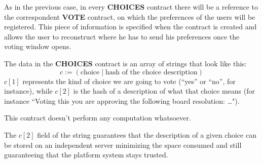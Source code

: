 \documentclass[submission, copyright,creativecommons,sharealike,noncommercial]{eptcs}
\newcommand{\Choices}{\textbf{CHOICES}\xspace}
\newcommand{\Vote}{\textbf{VOTE}\xspace}
\begin{document}
	As in the previous case, in every \Choices contract there will be a reference to the correspondent \Vote contract, on which the preferences of the users will be registered. This piece of information is specified when the contract is created and allows the user to reconstruct where he has to send his preferences once the voting window opens.
	
	The data in the \Choices contract is an array of strings that look like this: 
	\[
	c := (\text{choice} \mid \text{hash of the choice description})
	\]
	$c[1]$ represents the kind of choice we are going to vote (``yes'' or ``no'', for instance), while $c[2]$ is the hash of a description of what that choice means (for instance ``Voting this you are approving the following board resolution: \dots"). 

	This contract doesn't perform any computation whatsoever.
	
	The $c[2]$ field of the string guarantees that the description of a given choice can be stored on an independent server minimizing the space consumed and still guaranteeing that the platform system stays trusted.	 
%
%
\end{document}
